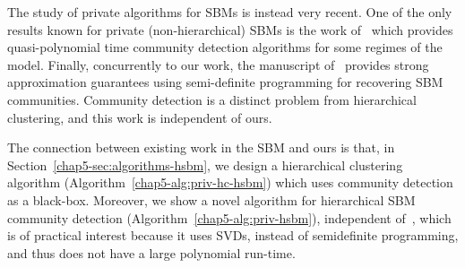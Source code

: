 The study of private algorithms for SBMs is instead very recent. One of the only results known for private (non-hierarchical) SBMs is the work of~\citet{seif2022differentially} which provides quasi-polynomial time community detection algorithms for some regimes of the model.
Finally, concurrently to our work, the manuscript of~\citet{chen2023private} provides strong approximation guarantees using semi-definite programming for recovering SBM communities. Community detection is a distinct problem from hierarchical clustering, and this work is independent of ours. 

The connection between existing work in the SBM and ours is that,
in Section~\ref{chap5-sec:algorithms-hsbm}, we design a hierarchical clustering algorithm (Algorithm~\ref{chap5-alg:priv-hc-hsbm}) which uses community detection as a black-box. Moreover, we show a novel algorithm for hierarchical SBM community detection (Algorithm~\ref{chap5-alg:priv-hsbm}), independent of~\citet{chen2023private}, which is of practical interest because it uses SVDs, instead of semidefinite programming, and thus does not have a large polynomial run-time.
